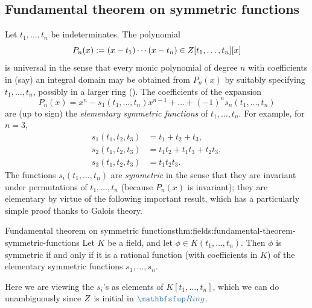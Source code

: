 \subsection{Fundamental theorem on symmetric functions}
\label{subsec:fields:fundamental-theorem-on-symmetric-functions}
Let $t_1, \dots, t_n$ be indeterminates. The polynomial
\[
  P_n(x) := (x - t_1)\cdots(x - t_n) \in Z[t_1, \dots, t_n][x]
\]
is universal in the sense that every monic polynomial of degree $n$ with
coefficients in (say) an integral domain may be obtained from $P_n(x)$
by suitably specifying $t_1, \dots, t_n$, possibly in a larger ring
(). The coefficients
of the expansion
\[
  P_n(x) = x^n - s_1(t_1, \dots, t_n)x^{n-1} + \dots + (-1)^n s_n(t_1,
  \dots, t_n)
\]
are (up to sign) the \emph{elementary symmetric functions} of
$t_1, \dots, t_n$. For example, for $n = 3$,
\begin{align*}
  s_1(t_1,t_2,t_3) &= t_1 + t_2 + t_3, \\
  s_2(t_1,t_2,t_3) &= t_1 t_2 + t_1 t_3 + t_2 t_3, \\
  s_3(t_1,t_2,t_3) &= t_1 t_2 t_3.
\end{align*}
The functions $s_i(t_1, \dots, t_n)$ are \emph{symmetric} in the sense
that they are invariant under permutations of $t_1, \dots, t_n$
(because $P_n(x)$ is invariant); they are elementary by virtue of the
following important result, which has a particularly simple proof
thanks to Galois theory.
\begin{thm}{Fundamental theorem on symmetric
    functions}{thm:fields:fundamental-theorem-symmetric-functions}
  Let $K$ be a field, and let $\phi \in K(t_1, \dots, t_n)$. Then
  $\phi$ is symmetric if and only if it is a rational function (with
  coefficients in $K$) of the elementary symmetric functions
  $s_1, \dots, s_n$.
\end{thm}

Here we are viewing the $s_i$'s as elements of $K[t_1, \dots, t_n]$,
which we can do unambiguously since $Z$ is initial in $\categ{Ring}$.

